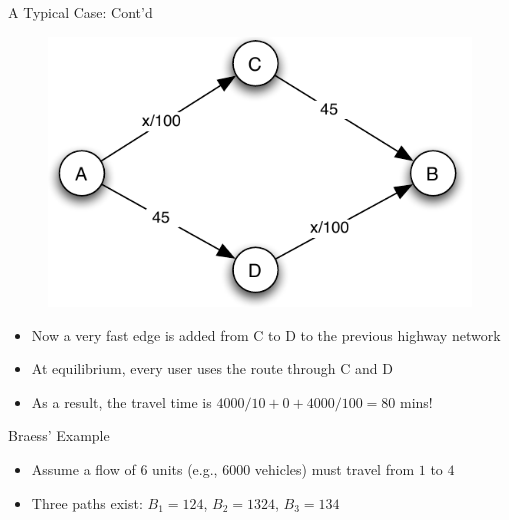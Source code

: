 \documentclass[10pt]{beamer}
\begin{document}
\begin{frame}{A Typical Case: Cont'd}
  \begin{figure}
    \includegraphics[scale=.8,page=2]{fig/note02/braess.pdf}
  \end{figure}
  \onslide<+->
  \begin{itemize}[<+->]
    \item Now a very fast edge is added from C to D to the previous highway network
    \item At equilibrium, every user uses the route through C and D 
    \item As a result, the travel time is $4000 / 10 + 0 + 4000 / 100 = 80$ mins!
  \end{itemize}
\end{frame}

\begin{frame}{Braess' Example}
  \begin{center}
  \end{center}
  \onslide<+->
  \begin{itemize}[<+->]
    \item Assume a flow of 6 units (e.g., 6000 vehicles) must travel from $1$ to $4$
    \item Three paths exist: $B_1 = 124$, $B_2 = 1324$, $B_3 = 134$
  \end{itemize}
\end{frame}
\end{document}

